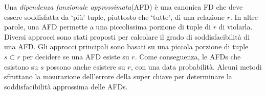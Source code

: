 Una \textit{dipendenza funzionale approssimata}(AFD) è una canonica FD che deve essere soddisfatta da \textquoteleft più' tuple, piuttosto che \textquoteleft tutte', di una relazione $r$. In altre parole, una AFD permette a una piccolissima porzione di tuple di $r$ di violarla. Diversi approcci sono stati proposti per calcolare il grado di soddisfacibilità di una AFD. Gli approcci principali sono basati su una piccola porzione di tuple $s \subset r$ per decidere se una AFD esiste su $r$. Come conseguenza, le AFDs che esistono su $s$ possono anche esistere su $r$, con una data probabilità. Alcuni metodi sfruttano la misurazione dell'errore della super chiave per determinare la soddisfacibilità approssima delle AFDs.   
